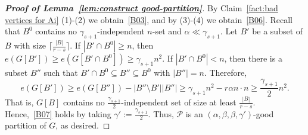\documentclass[11pt, a4paper]{article}
\theoremstyle{definition}
\newcommand{\<}{\subseteq}
\begin{document}
\begin{proof}[{\bf Proof of Lemma~\ref{lem:construct good-partition}}]
{By Claim~\ref{fact:bad vertices for Ai} (1)-(2) we obtain~\ref{B03}, and by (3)-(4) we obtain~\ref{B06}. Recall that %
$B^0$ contains no $\gamma_{s+1}$-independent $n$-set and $\alpha\ll\gamma_{s+1}$. %
Let $B'$ be a subset of $B$ with size $\lceil\frac{|B|}{r-s}\rceil$. If $|B'\cap B^0|\geq n$, then $e(G[B'])\geq e(G[B'\cap B^0])\geq \gamma_{s+1}n^2$.  If $|B'\cap B^0|< n$, then there is a subset $B''$ such that  $B'\cap B^0\subseteq B''\subseteq B^0$ with $|B''|=n$. Therefore,  
$$
e(G[B'])\geq e(G[B''])-|B''\setminus B'||B''|\geq \gamma_{s+1}n^2-r\alpha n\cdot n\geq \frac{\gamma_{s+1}}{2}n^2.
$$
That is, $G[B]$ contains no  $\frac{\gamma_{s+1}}{2}$-independent set of size at least $\frac{|B|}{r-s}$.  Hence,~\ref{B07} holds by taking $\gamma':=\frac{\gamma_{s+1}}{2}$. Thus, $\mathcal{P}$ is an  $(\alpha,\beta,\beta,\gamma')$-good partition of $G$, as desired.} 
\end{proof}


\end{document}
